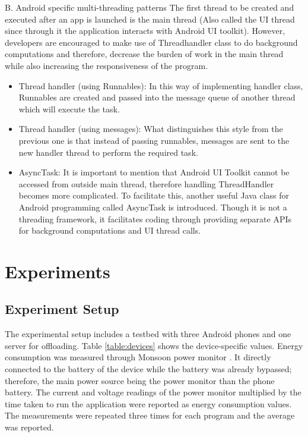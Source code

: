 \documentclass[conference,10pt]{IEEEtran}
\begin{document}
B.	Android specific multi-threading patterns 
The first thread to be created and executed after an app is launched is the main thread (Also called the UI thread since through it the application interacts with Android UI toolkit). However, developers are encouraged to make use of Threadhandler class to do background computations and therefore, decrease the burden of work in the main thread while also increasing the responsiveness of the program.

\begin{itemize}
	\item Thread handler (using Runnables): In this way of implementing handler class, Runnables are created and passed into the message queue of another thread which will execute the task. 
	\item Thread handler (using messages): What distinguishes this style from the previous one is that instead of passing runnables, messages are sent to the new handler thread to perform the required task.  
	\item AsyncTask: It is important to mention that Android UI Toolkit cannot be accessed from outside main thread, therefore handling ThreadHandler becomes more complicated. To facilitate this, another useful Java class for Android programming called AsyncTask is introduced. Though it is not a threading framework, it facilitates coding through providing separate APIs for background computations and UI thread calls.
\end{itemize}



\section{Experiments} 

\subsection{Experiment Setup}
The experimental setup includes a testbed with three Android phones and one server for offloading. Table \ref{table:devices} shows the device-specific values.
Energy consumption was measured through Monsoon power monitor \cite{monsoon}. It directly connected to the battery of the device while the battery was already bypassed; therefore, the main power source being the power monitor than the phone battery. The current and voltage readings of the power monitor multiplied by the time taken to run the application were reported as energy consumption values. The measurements were repeated three times for each program and the average was reported.
\end{document}
